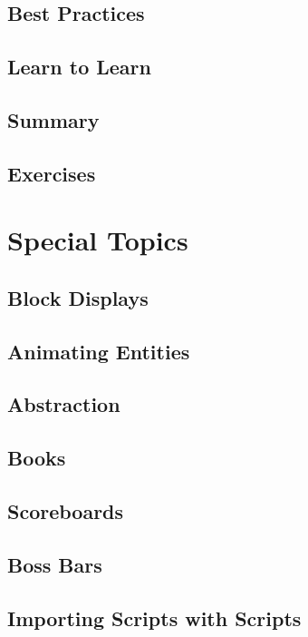 \documentclass[oneside]{book}
\begin{document}
\section{Best Practices}
\blindtext

\section{Learn to Learn}
\blindtext

\section{Summary}
\blindtext

\section{Exercises}
\blindtext

\chapter{Special Topics}
\blindtext

\section{Block Displays}
\blindtext

\section{Animating Entities}
\blindtext

\section{Abstraction}
\blindtext

\section{Books}
\blindtext

\section{Scoreboards}
\blindtext

\section{Boss Bars}
\blindtext

\section{Importing Scripts with Scripts}
\blindtext
\end{document}
